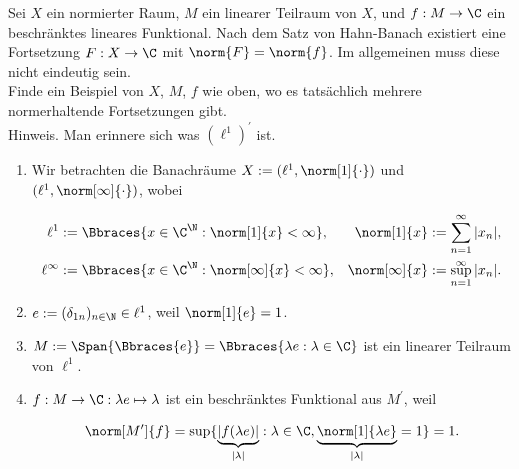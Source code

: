 \begin{exercise}

Sei $X$ ein normierter Raum, $M$ ein linearer Teilraum von $X$, und $f: M \to \C$ ein beschränktes lineares Funktional.
Nach dem Satz von Hahn-Banach existiert eine Fortsetzung $F: X \to \C$ mit $\norm{F} = \norm{f}$.
Im allgemeinen muss diese nicht eindeutig sein. \\

Finde ein Beispiel von $X$, $M$, $f$ wie oben, wo es tatsächlich mehrere normerhaltende Fortsetzungen gibt. \\

Hinweis.
Man erinnere sich was $(\ell^1)^\prime$ ist.

\end{exercise}

\begin{solution}

\phantom{}

\begin{enumerate}

  \item
  Wir betrachten die Banachräume $X := (\ell^1, \norm[1]{\cdot})$ und $(\ell^1, \norm[\infty]{\cdot})$, wobei

  \begin{align*}
    \ell^1
    & :=
    \Bbraces
    {
      x \in \C^\N:
      \norm[1]{x} < \infty
    },
    &
    \norm[1]{x}
    & :=
    \sum_{n=1}^\infty |x_n|, \\
    \ell^\infty
    & :=
    \Bbraces
    {
      x \in \C^\N:
      \norm[\infty]{x} < \infty
    },
    &
    \norm[\infty]{x}
    & :=
    \sup_{n=1}^\infty |x_n|.
  \end{align*}

  \item
  $e := (\delta_{1n})_{n \in \N} \in \ell^1$, weil $\norm[1]{e} = 1$.

  \item
  $M :=
  \Span{\Bbraces{e}} =
  \Bbraces{\lambda e: \lambda \in \C}$ ist ein linearer Teilraum von $\ell^1$.

  \item
  $f: M \to \C: \lambda e \mapsto \lambda$ ist ein beschränktes Funktional aus $M^\prime$, weil

  \begin{align*}
    \norm[M^\prime]{f}
    =
    \sup
    \{
      \underbrace{|f(\lambda e)|}_{|\lambda|}:
      \lambda \in \C,
      \underbrace{\norm[1]{\lambda e}}_{|\lambda|} = 1
    \} = 1.
  \end{align*}


\end{enumerate}
\end{solution}
